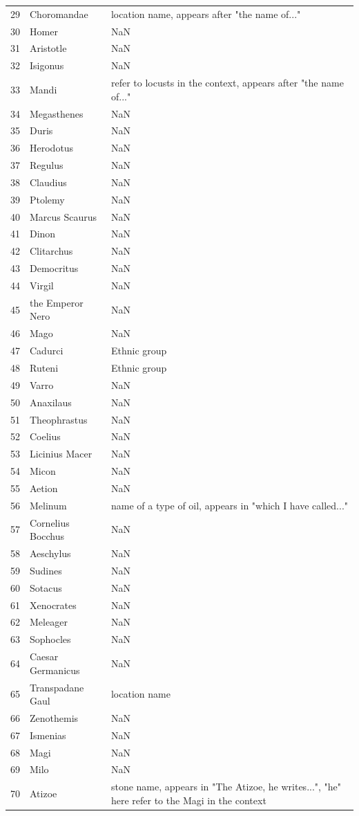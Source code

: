 \documentclass[
  12pt,
]{article}
\begin{document}
\begin{longtable}[]{@{}lll@{}}
29 & Choromandae & location name, appears after "the name of..." \\
30 & Homer & NaN \\
31 & Aristotle & NaN \\
32 & Isigonus & NaN \\
33 & Mandi & refer to locusts in the context, appears after "the name
of..." \\
34 & Megasthenes & NaN \\
35 & Duris & NaN \\
36 & Herodotus & NaN \\
37 & Regulus & NaN \\
38 & Claudius & NaN \\
39 & Ptolemy & NaN \\
40 & Marcus Scaurus & NaN \\
41 & Dinon & NaN \\
42 & Clitarchus & NaN \\
43 & Democritus & NaN \\
44 & Virgil & NaN \\
45 & the Emperor Nero & NaN \\
46 & Mago & NaN \\
47 & Cadurci & Ethnic group \\
48 & Ruteni & Ethnic group \\
49 & Varro & NaN \\
50 & Anaxilaus & NaN \\
51 & Theophrastus & NaN \\
52 & Coelius & NaN \\
53 & Licinius Macer & NaN \\
54 & Micon & NaN \\
55 & Aetion & NaN \\
56 & Melinum & name of a type of oil, appears in "which I have
called..." \\
57 & Cornelius Bocchus & NaN \\
58 & Aeschylus & NaN \\
59 & Sudines & NaN \\
60 & Sotacus & NaN \\
61 & Xenocrates & NaN \\
62 & Meleager & NaN \\
63 & Sophocles & NaN \\
64 & Caesar Germanicus & NaN \\
65 & Transpadane Gaul & location name \\
66 & Zenothemis & NaN \\
67 & Ismenias & NaN \\
68 & Magi & NaN \\
69 & Milo & NaN \\
70 & Atizoe & stone name, appears in "The Atizoe, he writes...", "he"
here refer to the Magi in the context \\
\end{longtable}
\end{document}
